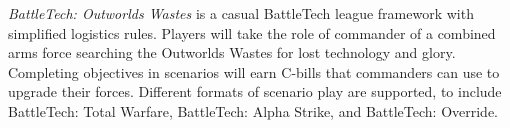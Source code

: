\emph{BattleTech: Outworlds Wastes} is a casual BattleTech league framework with simplified logistics rules.
Players will take the role of commander of a combined arms force searching the Outworlds Wastes for lost technology and glory.
Completing objectives in scenarios will earn C-bills that commanders can use to upgrade their forces.
Different formats of scenario play are supported, to include BattleTech: Total Warfare, BattleTech: Alpha Strike, and BattleTech: Override.
